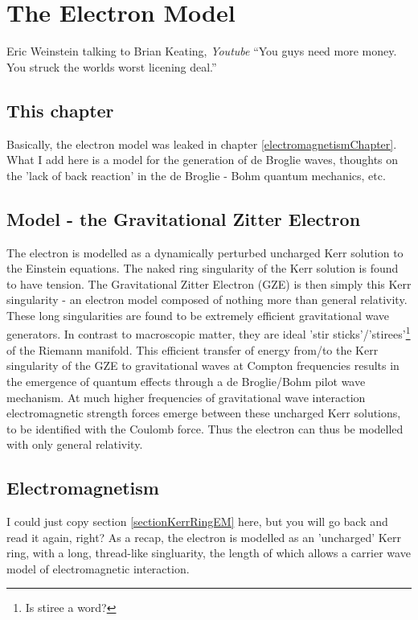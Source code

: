 \documentclass[../rzero]{subfiles}
\begin{document}
\chapter{The Electron Model}\label{electronModelChapter}

\begin{chapquote}{Eric Weinstein talking to Brian Keating, \textit{Youtube\cite{drbriankeatingEricWeinsteinTheoretical2020}}}
``You guys need more money. You struck the worlds worst licening deal.''
\end{chapquote}


\section{This chapter}

Basically, the electron model was leaked in chapter \ref{electromagnetismChapter}. What I add here is a model for the generation of de Broglie waves, thoughts on the 'lack of back reaction' in the de Broglie - Bohm quantum mechanics, etc. 

\section{Model - the Gravitational Zitter Electron}
The electron is modelled as a dynamically perturbed uncharged Kerr solution to the Einstein equations. The naked ring singularity of the Kerr solution is found to have tension.  The  Gravitational Zitter Electron (GZE) is then simply this Kerr singularity - an electron model composed of nothing more than general relativity. These long singularities are found to be extremely efficient gravitational wave generators. In contrast to macroscopic matter, they are ideal 'stir sticks'/'stirees'\footnote{Is stiree a word?} of the Riemann manifold. This efficient transfer of energy from/to the Kerr singularity of the GZE to gravitational waves at Compton frequencies results in the emergence of quantum effects through a de Broglie/Bohm pilot wave mechanism. At much higher frequencies of gravitational wave interaction electromagnetic strength forces emerge between these uncharged Kerr solutions, to be identified with the Coulomb force. Thus the electron can thus be modelled with only general relativity. 

\section{Electromagnetism}
I could just copy section \ref{sectionKerrRingEM} here, but you will go back and read it again, right? As a recap, the electron is modelled as an 'uncharged' Kerr ring, with a long, thread-like singluarity, the length of which allows a carrier wave model of electromagnetic interaction. 
\end{document}
